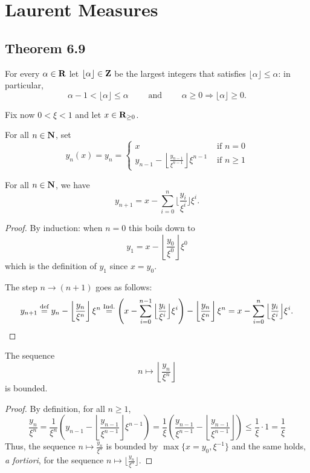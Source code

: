 \section{Laurent Measures}
\subsection{Theorem 6.9}
For every $\alpha\in\mathbf{R}$ let $\lfloor \alpha\rfloor\in\mathbf{Z}$ be the largest integers that satisfies $\lfloor \alpha\rfloor\le \alpha$: in particular,
\[
\alpha-1< \lfloor \alpha\rfloor\le \alpha\qquad\text{ and }\qquad \alpha\geq 0 \Longrightarrow \lfloor \alpha\rfloor \geq 0.
\]

Fix now $0< \xi<1$ and let $x\in\mathbf{R}_{\geq 0}$. 
\begin{definition}\label{def:sequence_y}
For all $n\in\mathbf{N}$, set
\[
y_n(x)=y_n=\begin{cases} x&\text{ if }n=0\\
    y_{n-1}-\left\lfloor \frac{y_{n-1}}{\xi^{n-1}}\right\rfloor\xi^{n-1}&\text{ if }n\ge 1
\end{cases}\]
\end{definition}
\begin{lemma}\label{lemma:finite_sum} For all $n\in\mathbf{N}$, we have
\[
y_{n+1}=x-\sum_{i=0}^n\Big\lfloor\frac{y_i}{\xi^i}\Big\rfloor\xi^i.
\]
\end{lemma}
\begin{proof}
By induction: when $n=0$ this boils down to
\[
y_1=x-\left\lfloor \frac{y_0}{\xi^0}\right\rfloor \xi^0
\]
which is the definition of $y_1$ since $x=y_0$.

The step $n\to (n+1)$ goes as follows:
\[
y_{n+1}\overset{\text{def}}{=}y_{n}-\left\lfloor\frac{y_{n}}{\xi^{n}}\right\rfloor\xi^{n}\overset{\text{Ind.}}{=}\left(x-\sum_{i=0}^{n-1}\Big\lfloor\frac{y_i}{\xi^i}\Big\rfloor\xi^i\right)-\left\lfloor\frac{y_{n}}{\xi^{n}}\right\rfloor\xi^{n}=x-\sum_{i=0}^n\Big\lfloor\frac{y_i}{\xi^i}\Big\rfloor\xi^i.
\qedhere
\]
\end{proof}
\begin{lemma}\label{lemma:bounded} The sequence
\[
n\mapsto \left\lfloor\frac{y_n}{\xi^n}\right\rfloor
\]
is bounded.
\end{lemma}
\begin{proof} By definition, for all $n\geq 1$,
\[
\frac{y_n}{\xi^n}=\frac{1}{\xi^n}\left(y_{n-1}-\left\lfloor\frac{y_{n-1}}{\xi^{n-1}}\right\rfloor\xi^{n-1}\right)=\frac{1}{\xi}\left(\frac{y_{n-1}}{\xi^{n-1}}-\left\lfloor\frac{y_{n-1}}{\xi^{n-1}}\right\rfloor\right)\le \frac{1}{\xi}\cdot 1= \frac{1}{\xi}
\]
Thus, the sequence $n\mapsto \frac{y_n}{\xi^n}$ is bounded by $\max\{x=y_0,\xi^{-1}\}$ and the same holds, \emph{a fortiori}, for the sequence $n\mapsto \lfloor\frac{y_n}{\xi^n}\rfloor$. 
\end{proof}
